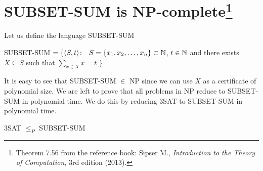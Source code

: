 \section{\texorpdfstring{SUBSET-SUM is NP-complete\footnote{%
Theorem 7.56 from the reference book: Sipser M.,
\emph{Introduction to the Theory of Computation}, 3rd edition
(2013).}}{SUBSET-SUM is NP-complete}}
Let us define the language SUBSET-SUM
\begin{definition}
	SUBSET-SUM \(= \{\langle S, t\rangle \colon\,\)
	\(S = \{x_1,x_2,\ldots,x_n\} \subset \mathbb{N}\),
	\(t \in \mathbb{N}\) and there exists \(X \subseteq S\) such that
	\(\sum_{x \in X} x = t\)
	\(\}\)
\end{definition}
It is easy to see that SUBSET-SUM \(\in\) NP since we can use \(X\) as a
certificate of polynomial size.
We are left to prove that all problems in NP reduce to SUBSET-SUM in polynomial
time. We do this by reducing 3SAT to SUBSET-SUM in polynomial time.
\begin{theorem}
	3SAT \(\le_P\) SUBSET-SUM
\end{theorem}

